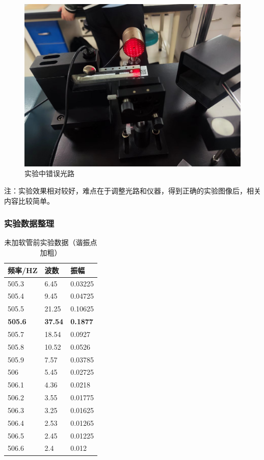 \documentclass[dvipsnames, svgnames,a4paper,11pt]{article}
\begin{document}
	\begin{figure}[H]
		\centering
		\includegraphics[width=0.4\linewidth]{images/错误}
		\caption{实验中错误光路}
		\label{}
	\end{figure}
	注：实验效果相对较好，难点在于调整光路和仪器，得到正确的实验图像后，相关内容比较简单。
		\subsubsection{实验数据整理}
		\begin{table}[H]
			\centering
			\begin{tabular}{|l|l|l|}
			\hline
			频率/HZ & 波数    & 振幅      \\ \hline
			505.3 & 6.45  & 0.03225 \\ \hline
			505.4 & 9.45  & 0.04725 \\ \hline
			505.5 & 21.25 & 0.10625 \\ \hline
			\textbf{505.6} & \textbf{37.54} & \textbf{0.1877}  \\ \hline
			505.7 & 18.54 & 0.0927  \\ \hline
			505.8 & 10.52 & 0.0526  \\ \hline
			505.9 & 7.57  & 0.03785 \\ \hline
			506   & 5.45  & 0.02725 \\ \hline
			506.1 & 4.36  & 0.0218  \\ \hline
			506.2 & 3.55  & 0.01775 \\ \hline
			506.3 & 3.25  & 0.01625 \\ \hline
			506.4 & 2.53  & 0.01265 \\ \hline
			506.5 & 2.45  & 0.01225 \\ \hline
			506.6 & 2.4   & 0.012   \\ \hline
			\end{tabular}
			\caption{未加软管前实验数据（谐振点加粗）}
			\label{未加软管前实验数据}
		\end{table}
		
\end{document}
